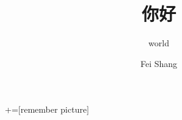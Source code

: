 \documentclass[10pt,aspectratio=169]{beamer}
\title[USTC]{你好}
\subtitle{world}
\author[Fei. S]{Fei Shang}
\institute[shf\_1998@outlook.com]{USTC}
\date[\today]
{}
\begin{document}
+=[remember picture]

\everymath{\displaystyle}

\frame{\titlepage}
\end{document}
